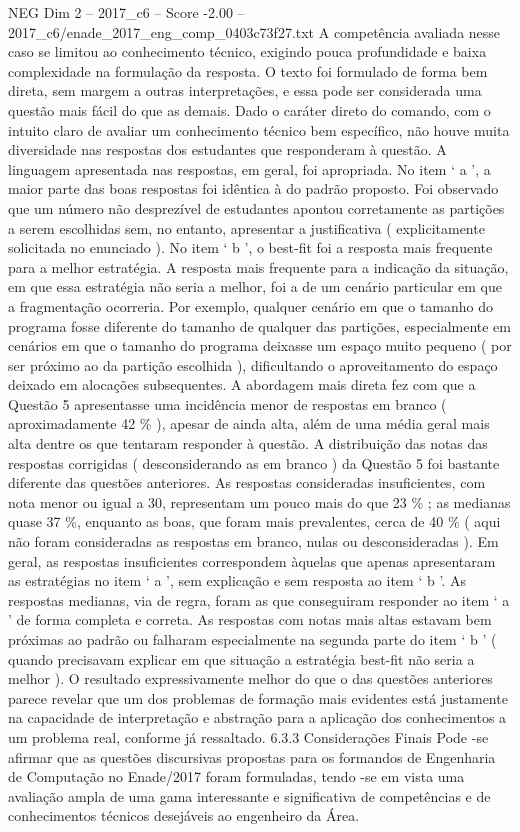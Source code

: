 \begin{textsample}{NEG Dim 2 – 2017\_c6 – Score -2.00 – 2017\_c6/enade\_2017\_eng\_comp\_0403c73f27.txt}
A competência avaliada nesse caso se limitou ao conhecimento técnico, exigindo pouca profundidade e baixa complexidade na formulação da resposta.
O texto foi formulado de forma bem direta, sem margem a outras interpretações, e essa pode ser considerada uma questão mais fácil do que as demais.
Dado o caráter direto do comando, com o intuito claro de avaliar um conhecimento técnico bem específico, não houve muita diversidade nas respostas dos estudantes que responderam à questão.
A linguagem apresentada nas respostas, em geral, foi apropriada.
No item ‘ a ’, a maior parte das boas respostas foi idêntica à do padrão proposto.
Foi observado que um número não desprezível de estudantes apontou corretamente as partições a serem escolhidas sem, no entanto, apresentar a justificativa ( explicitamente solicitada no enunciado ).
No item ‘ b ’, o best-fit foi a resposta mais frequente para a melhor estratégia.
A resposta mais frequente para a indicação da situação, em que essa estratégia não seria a melhor, foi a de um cenário particular em que a fragmentação ocorreria.
Por exemplo, qualquer cenário em que o tamanho do programa fosse diferente do tamanho de qualquer das partições, especialmente em cenários em que o tamanho do programa deixasse um espaço muito pequeno ( por ser próximo ao da partição escolhida ), dificultando o aproveitamento do espaço deixado em alocações subsequentes.
A abordagem mais direta fez com que a Questão 5 apresentasse uma incidência menor de respostas em branco ( aproximadamente 42 \% ), apesar de ainda alta, além de uma média geral mais alta dentre os que tentaram responder à questão.
A distribuição das notas das respostas corrigidas ( desconsiderando as em branco ) da Questão 5 foi bastante diferente das questões anteriores.
As respostas consideradas insuficientes, com nota menor ou igual a 30, representam um pouco mais do que 23 \% ; as medianas quase 37 \%, enquanto as boas, que foram mais prevalentes, cerca de 40 \% ( aqui não foram consideradas as respostas em branco, nulas ou desconsideradas ).
Em geral, as respostas insuficientes correspondem àquelas que apenas apresentaram as estratégias no item ‘ a ’, sem explicação e sem resposta ao item ‘ b ’.
As respostas medianas, via de regra, foram as que conseguiram responder ao item ‘ a ’ de forma completa e correta.
As respostas com notas mais altas estavam bem próximas ao padrão ou falharam especialmente na segunda parte do item ‘ b ’ ( quando precisavam explicar em que situação a estratégia best-fit não seria a melhor ).
O resultado expressivamente melhor do que o das questões anteriores parece revelar que um dos problemas de formação mais evidentes está justamente na capacidade de interpretação e abstração para a aplicação dos conhecimentos a um problema real, conforme já ressaltado. 6.3.3 Considerações Finais Pode -se afirmar que as questões discursivas propostas para os formandos de Engenharia de Computação no Enade/2017 foram formuladas, tendo -se em vista uma avaliação ampla de uma gama interessante e significativa de competências e de conhecimentos técnicos desejáveis ao engenheiro da Área.

\end{textsample}
